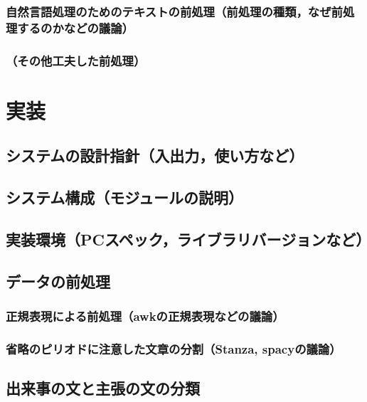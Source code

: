\documentclass[12pt,a4j]{jreport}
\begin{document}
\subsection{自然言語処理のためのテキストの前処理（前処理の種類，なぜ前処理するのかなどの議論）}


\subsection{（その他工夫した前処理）}



\chapter{実装}


\section{システムの設計指針（入出力，使い方など）}


\section{システム構成（モジュールの説明）}


\section{実装環境（PCスペック，ライブラリバージョンなど）}


\section{データの前処理}


\subsection{正規表現による前処理（awkの正規表現などの議論）}


\subsection{省略のピリオドに注意した文章の分割（Stanza, spacyの議論）}


\section{出来事の文と主張の文の分類}
\end{document}

